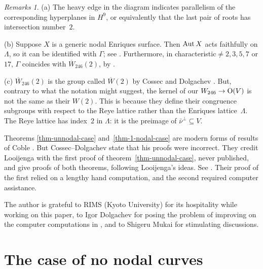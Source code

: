 \documentclass[12pt]{amsart}
\def\Aut{\mathop{\rm Aut}\nolimits}
\def\Orth{{\rm O}}
\def\Sp{{\rm Sp}}
\def\nubar{{\bar{\nu}}}
\def\Wbar{\overline{W}}
\def\iso{\cong}
\def\sset{\subseteq}
\numberwithin{theorem}{section}
\numberwithin{equation}{section}
\numberwithin{figure}{section}
\theoremstyle{remark}
\newtheorem*{remarks}{Remarks}
\begin{document}
\begin{remarks}  
(a) The heavy edge in the diagram
  indicates parallelism of the corresponding hyperplanes in $H^9$, or
  equivalently that the last pair of roots has intersection number~$2$.  

  (b) Suppose $X$ is a generic nodal Enriques surface.  Then $\Aut X$ acts
  faithfully on $\Lambda$, so  it can be identified with
  $\Gamma$; see \cite[Prop.\ 7.4.1]{CD-new}.  Furthermore, in characteristic${}\neq2,3,5,7$ or $17$,
  $\Gamma$ coincides with $\Wbar_{\!246}(2)$, by
  \cite[Thm.\ 1]{Cossec-Dolgachev-published}.

  (c) $\Wbar_{\!246}(2)$ is the group called $\Wbar(2)$ by Cossec and
  Dolgachev \cite{Cossec-Dolgachev-published}.  But, contrary to what
  the notation might suggest, the kernel of our $W_{246}\to\Orth(V)$ is not
  the same as their $W(2)$.  This is because they define their
  congruence subgroups with respect to the Reye lattice rather than
  the Enriques lattice~$\Lambda$.  The Reye lattice has index~$2$ in
  $\Lambda$: it is the preimage of $\nubar^\perp\sset V$.
\end{remarks}

Theorems \ref{thm-unnodal-case} and~\ref{thm-1-nodal-case} are modern forms of results of Coble
\cite[Thms.\ (4) and (30)]{Coble}. But Cossec--Dolgachev
\cite[p.~162]{CD-old} state that his proofs were incorrect.  They
credit Looijenga with the first proof of theorem~\ref{thm-unnodal-case}, never
published, and give  proofs of both theorems, following Looijenga's
ideas.  See
\cite[Thms.\ 2.10.1 and~2.10.2]{CD-old}.  Their proof of the first
relied on a lengthy hand computation, and the second required computer
assistance.

The author is grateful to RIMS (Kyoto University) for its hospitality
while working on this paper, to Igor Dolgachev for posing the problem
of improving on the computer computations in \cite{CD-old}, and to
Shigeru Mukai for stimulating discussions.

\section{The case of no nodal curves}
\label{sec-no-nodal}
\end{document}
